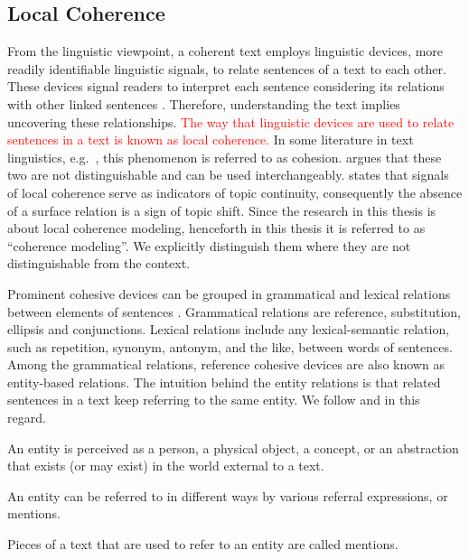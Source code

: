 \subsection{Local Coherence}

From the linguistic viewpoint, a coherent text employs linguistic devices, more readily identifiable linguistic signals, to relate sentences of a text to each other. 
These devices signal readers to interpret each sentence considering its relations with other linked sentences \cite{vandijk77}. 
Therefore, understanding the text implies uncovering these relationships.  
\textcolor{red}{The way that linguistic devices are used to relate sentences in a text is known as local coherence.} 
In some literature in text linguistics, e.g.\ , this phenomenon is referred to as cohesion.   
 argues that these two are not distinguishable and can be used interchangeably. 
 states that signals of local coherence serve as indicators of topic continuity, consequently the absence of a surface relation is a sign of topic shift. 
Since the research in this thesis is about local coherence modeling, henceforth in this thesis it is referred to as ``coherence modeling''. 
We explicitly distinguish them where they are not distinguishable from the context. 

Prominent cohesive devices can be grouped in grammatical and lexical relations between elements of sentences \cite{halliday76}. 
Grammatical relations are reference, substitution, ellipsis and conjunctions. 
Lexical relations include any lexical-semantic relation, such as repetition, synonym, antonym, and the like, between words of sentences. 
Among the grammatical relations, reference cohesive devices are also known as entity-based relations.  The intuition behind the entity relations is that related sentences in a text keep referring to the same entity. 
We follow  and  in this regard.  

\begin{definition}
    An entity is perceived as a person, a physical object, a concept, or an abstraction that exists (or may exist) in the world external to a text.  
\end{definition}

An entity can be referred to in different ways by various referral expressions, or mentions. 

\begin{definition}
	Pieces of a text that are used to refer to an entity are called mentions. 
\end{definition}

